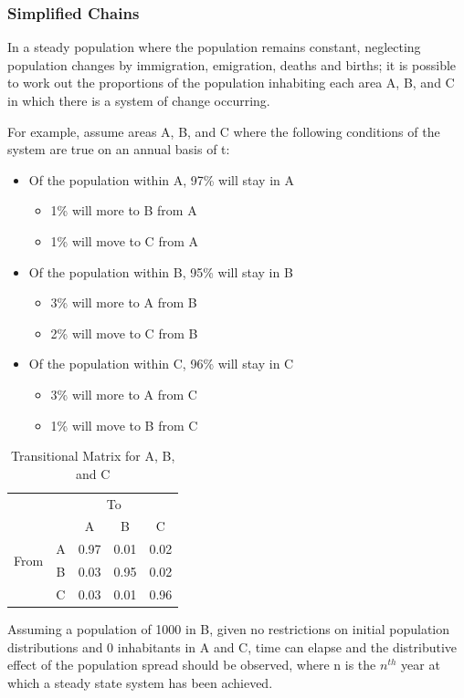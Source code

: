 \documentclass[12pt]{article}
\begin{document}
\subsubsection{Simplified Chains}
In a steady population where the population remains constant, neglecting population changes by immigration, emigration, deaths and births; it is possible to work out the proportions of the population inhabiting each area A, B, and C in which there is a system of change occurring.

For example, assume areas A, B, and C where the following conditions of the system are true on an annual basis of t:
\begin{itemize}
\item Of the population within A, 97\% will stay in A
\begin{itemize}
\item 1\% will more to B from A
\item 1\% will move to C from A
\end{itemize}
\item Of the population within B, 95\% will stay in B
\begin{itemize}
\item 3\% will more to A from B
\item 2\% will move to C from B
\end{itemize}
\item Of the population within C, 96\% will stay in C
\begin{itemize}
\item 3\% will more to A from C
\item 1\% will move to B from C
\end{itemize}
\end{itemize}

\begin{table}[h]
\centering
\begin{tabular}{ccccc}
                      & \multicolumn{4}{c}{To} \\
\multirow{4}{*}{From} &   & A    & B    & C    \\
                      & A & 0.97 & 0.01 & 0.02 \\
                      & B & 0.03 & 0.95 & 0.02 \\
                      & C & 0.03 & 0.01 & 0.96
\end{tabular}
\caption{Transitional Matrix for A, B, and C}
\end{table}

Assuming a population of 1000 in B, given no restrictions on initial population distributions and 0 inhabitants in A and C, time can elapse and the distributive effect of the population spread should be observed, where n is the $n^{th}$ year at which a steady state system has been achieved.
\end{document}
